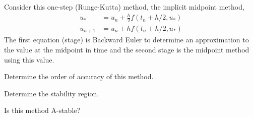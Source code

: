 \documentclass[minion]{homework}
\begin{document}
\begin{problems}
\problem Consider this one-step (Runge-Kutta) method, the 
implicit midpoint method,
\begin{equation}
\begin{aligned}
u_* &= u_n + \frac{h}{2} f(t_n+h/2,u_*) \\
u_{n+1} &=  u_n + h f(t_n+h/2,u_*)
\end{aligned}
\end{equation}
The first equation (stage) is Backward Euler to determine an approximation to the value at the midpoint in time and the second stage is the midpoint method using this value.
\begin{subproblems}
\item Determine the order of accuracy of this method.
\item Determine the stability region.
\item Is this method A-stable? 
\end{subproblems}
\end{problems}
\end{document}
